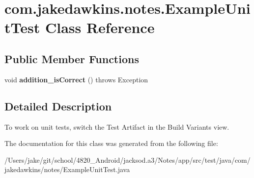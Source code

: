 \hypertarget{classcom_1_1jakedawkins_1_1notes_1_1_example_unit_test}{}\section{com.\+jakedawkins.\+notes.\+Example\+Unit\+Test Class Reference}
\label{classcom_1_1jakedawkins_1_1notes_1_1_example_unit_test}
\subsection*{Public Member Functions}
\begin{DoxyCompactItemize}
\item 
void {\bfseries addition\+\_\+is\+Correct} ()  throws Exception \hypertarget{classcom_1_1jakedawkins_1_1notes_1_1_example_unit_test_a44d58f1d8b8d9a427f40a3f27b94cbe8}{}\label{classcom_1_1jakedawkins_1_1notes_1_1_example_unit_test_a44d58f1d8b8d9a427f40a3f27b94cbe8}

\end{DoxyCompactItemize}


\subsection{Detailed Description}
To work on unit tests, switch the Test Artifact in the Build Variants view. 

The documentation for this class was generated from the following file\+:\begin{DoxyCompactItemize}
\item 
/\+Users/jake/git/school/4820\+\_\+\+Android/jacksod.\+a3/\+Notes/app/src/test/java/com/jakedawkins/notes/Example\+Unit\+Test.\+java\end{DoxyCompactItemize}
